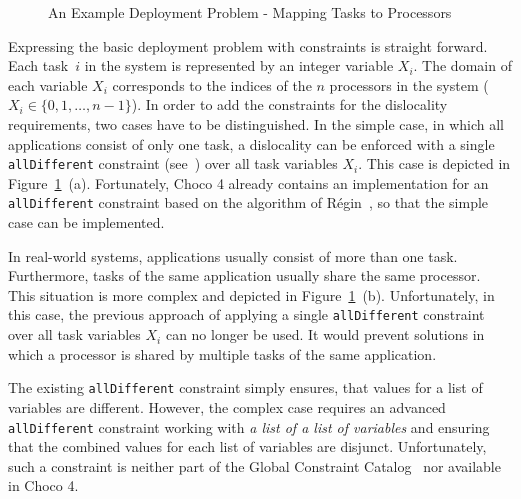 \documentclass[english,biblatex]{lni}
\begin{document}
\begin{figure}
\centering
{}%
\hfill
{}%
\caption{An Example Deployment Problem - Mapping Tasks to Processors}
\label{example}
\end{figure}

Expressing the basic deployment problem with constraints is straight forward.
Each task~$i$ in the system is represented by an integer variable $X_i$.
The domain of each variable $X_i$ corresponds to the indices of the $n$ processors in the system ($X_i  \in \{0, 1, \dots, n-1\}$).
In order to add the constraints for the dislocality requirements, two cases have to be distinguished. 
In the simple case, in which all applications consist of only one task, a dislocality can be enforced with a single \texttt{allDifferent} constraint (see~\cite{GCCAT2014}) over all task variables $X_i$.
This case is depicted in Figure~\ref{example}~(a).
Fortunately, Choco 4 already contains an implementation for an \texttt{allDifferent} constraint based on the algorithm of Régin~\cite{Regin1994}, so that the simple case can be implemented.

In real-world systems, applications usually consist of more than one task.
Furthermore, tasks of the same application usually share the same processor.
This situation is more complex and depicted in Figure~\ref{example}~(b).
Unfortunately, in this case, the previous approach of applying a single \texttt{allDifferent} constraint over all task variables $X_i$ can no longer be used.
It would prevent solutions in which a processor is shared by multiple tasks of the same application.

The existing \texttt{allDifferent} constraint simply ensures, that values for a list of variables are different.
However, the complex case requires an advanced \texttt{allDifferent} constraint working with \emph{a list of a list of variables} and ensuring that the combined values for each list of variables are disjunct.
Unfortunately, such a constraint is neither part of the Global Constraint Catalog~\cite{GCCAT2014} nor available in Choco 4.
\end{document}
